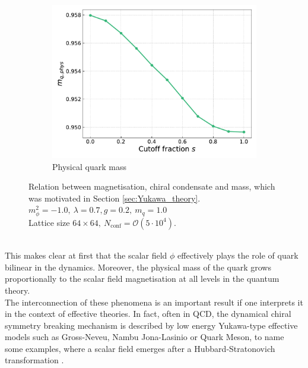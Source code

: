 \begin{figure}[h]
\begin{subfigure}[b]{0.47\textwidth}
        \includegraphics[width=1.0\textwidth]{figures/slide_broken/mass.pdf}
        \caption{Physical quark mass}
    \end{subfigure}
    \caption[Relation between magnetisation, condensate and mass]{Relation between magnetisation, chiral condensate and mass, which was motivated in Section \ref{sec:Yukawa_theory}. \\ $m_\phi^2=-1.0, \ \lambda=0.7, g=0.2, \ m_q = 1.0$ \\ Lattice size $64 \times 64, \ N_\text{conf} = \mathcal{O}(5 \cdot 10^4)$.}
    \label{fig:interpolation_relation_phi_cond_mass}
\end{figure} \\
This makes clear at first that the scalar field $\phi$ effectively plays the role of quark bilinear in the dynamics. Moreover, the physical mass of the quark grows proportionally to the scalar field magnetisation at all levels in the quantum theory. \\
The interconnection of these phenomena is an important result if one interprets it in the context of effective theories. In fact, often in QCD, the dynamical chiral symmetry breaking mechanism is described by low energy Yukawa-type effective models such as Gross-Neveu, Nambu \textendash{} Jona-Lasinio or Quark Meson, to name some examples, where a scalar field emerges after a Hubbard-Stratonovich transformation \cite{hubbard}. \\
